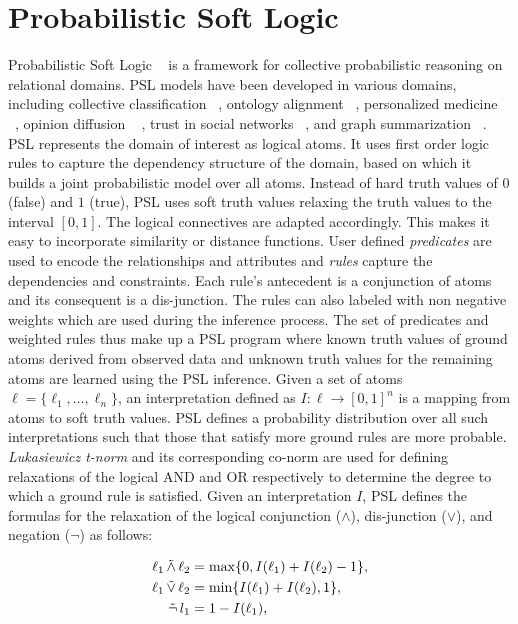 \section{Probabilistic Soft Logic}
Probabilistic Soft Logic ~\cite{kimmig2012short} is a framework for collective probabilistic reasoning on relational domains.
PSL models have been developed in various domains, including collective classification ~\cite{broecheler2010computing}, ontology alignment ~\cite{brocheler2012probabilistic}, personalized medicine ~\cite{bach2010decision}, opinion diffusion ~\cite{bach2012scaling} , trust in social networks ~\cite{huang2012probabilistic}, and graph summarization ~\cite{memory2012graph}.
PSL represents the domain of interest as logical atoms.
It uses first order logic rules to capture the dependency structure of the domain, based on which it builds a joint probabilistic model over all atoms.
Instead of hard truth values of $0$ (false) and $1$ (true), PSL uses soft truth values relaxing the truth values to the interval $[0,1]$.
The logical connectives are adapted accordingly.
This makes it easy to incorporate similarity or distance functions.
\newline
User defined \emph{predicates} are used to encode the relationships and attributes and \emph{rules} capture the  dependencies and constraints.
Each rule's antecedent is a conjunction of atoms and its consequent is a dis-junction. 
The rules can also labeled with non negative weights which are used during the inference process. 
The set of predicates and weighted rules thus make up a PSL program where known truth values of ground atoms derived from observed data and unknown truth values for the remaining atoms are learned using the PSL inference.
\newline
Given a set of atoms 
$\ell = \{\ell_1,\ldots,\ell_n\}$,
an interpretation defined as 
$I : \ell \rightarrow [0,1]^n$
is a mapping from atoms to soft truth values.
PSL defines a probability distribution over all such interpretations such that those that satisfy more ground rules are more probable.
\emph{Lukasiewicz t-norm} and its corresponding co-norm are used for defining relaxations of the logical AND and OR respectively to determine the degree to which a ground rule is satisfied.
Given an interpretation $\mathit{I}$, PSL defines the formulas for the relaxation of the logical conjunction ($\wedge$), dis-junction ($\vee$), and negation ($\neg$) as follows:

\begin{align*}
\ell_1 \softand \ell_2 &= \max\{0, I(\ell_1) + I(\ell_2) - 1\},\\
\ell_1 \softor \ell_2 &= \min\{I(\ell_1) + I(\ell_2), 1\},\\
\softneg l_1 &= 1 - I(\ell_1),
\end{align*}  

